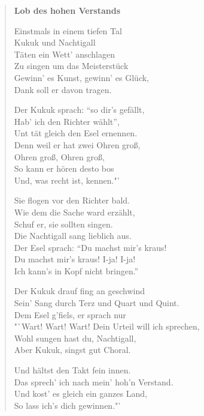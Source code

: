 \documentclass{article}
\begin{document}
\begin{verse}
\textbf{Lob des hohen Verstands}

Einstmals in einem tiefen Tal\\
Kukuk und Nachtigall\\
T\"aten ein Wett' anschlagen\\
Zu singen um das Meisterst\"uck\\
Gewinn' es Kunst, gewinn' es Gl\"uck,\\
Dank soll er davon tragen.

Der Kukuk sprach: "`so dir's gef\"allt,\\
Hab' ich den Richter w\"ahlt"',\\
Unt t\"at gleich den Esel ernennen.\\
Denn weil er hat zwei Ohren gro\ss,\\
Ohren gro\ss, Ohren gro\ss,\\
So kann er h\"oren desto bos\\
Und, was recht ist, kennen."'

Sie 
flogen vor den Richter bald.\\
Wie dem die Sache ward erz\"ahlt,\\
Schuf er, sie sollten singen.\\
Die Nachtigall sang lieblich aus.\\
Der Esel sprach: "`Du machst mir's kraus!\\
Du machst mir's kraus! I-ja! I-ja!\\
Ich kann's in Kopf nicht bringen."'

Der Kukuk drauf fing an geschwind\\
Sein' Sang durch Terz und Quart und Quint.\\
Dem Esel g'fiels, er sprach nur\\
"`Wart! Wart! Wart! Dein Urteil will ich sprechen,\\
Wohl sungen hast du, Nachtigall,\\
Aber Kukuk, singst gut Choral.

Und h\"altst den Takt fein innen.\\
Das sprech' ich nach mein' hoh'n Verstand.\\
Und kost' es gleich ein ganzes Land,\\
So lass ich's dich gewinnen."'\\
\end{verse}
\end{document}
